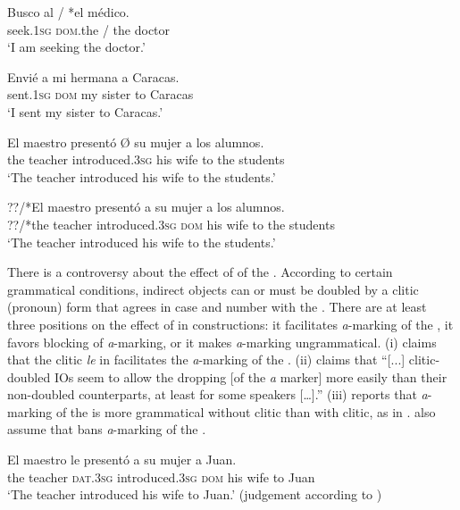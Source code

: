 \documentclass[output=paper]{LSP/langsci}
\begin{document}
\ea \label{11-he-ex:1}
\gll Busco al /{ } *el médico.\\
seek.1\textsc{sg} \textsc{dom}.the /{ } the doctor\\
\glt ‘I am seeking the doctor.’
\z

\ea
\label{11-he-ex:2}
\gll Envié a mi hermana a Caracas.\\
sent.1\textsc{sg} \textsc{dom} my sister to Caracas\\
\glt ‘I sent my sister to Caracas.’
\z

\ea
\label{11-he-ex:3}
\gll El maestro presentó Ø su mujer a los alumnos.\\
the teacher introduced.3\textsc{sg} {} his wife to the students\\
\glt ‘The teacher introduced his wife to the students.’
\z

\ea%
\label{11-he-ex:4}
\gll ??/*El maestro presentó a su mujer a los alumnos.\\
??/*the teacher introduced.3\textsc{sg} \textsc{dom} his wife to the students\\
\glt ‘The teacher introduced his wife to the students.’
\z


There is a controversy about the effect of  of the . According to certain grammatical conditions, indirect objects can or must be doubled by a clitic (pronoun) form that agrees in case and number with the  \citep{Campos1999Transitividad,Gabrieletal2010Information}. There are at least three positions on the effect of  in  constructions: it facilitates \textit{a}-marking of the , it favors blocking of \textit{a}-marking, or it makes \textit{a}-marking ungrammatical. (i) \citet{Company1998Interplay,Company2002Avance} claims that the clitic \textit{le} in  facilitates the \textit{a}-marking of the . (ii) \citet[216]{Mondonedo2007Syntax} claims that “[...] clitic-doubled IOs seem to allow the dropping [of the \textit{a} marker] more easily than their non-doubled counterparts, at least for some speakers […].” (iii) \citet[31]{Fabregas2013Differential} reports that \textit{a}-marking of the  is more grammatical without clitic than with clitic, as in . \citet[224]{Ormazaletal2013Differential} also assume that  bans \textit{a}-marking of the .

\ea
\label{11-he-ex:5}
\gll El maestro le presentó a su mujer a Juan.\\
the teacher \textsc{dat}.3\textsc{sg} introduced.\textsc{3sg} \textsc{dom} his wife to Juan\\
\glt ‘The teacher introduced his wife to Juan.’ (judgement according to \citealt[20]{CompanyCompany2001Multiple})
\z
\end{document}
